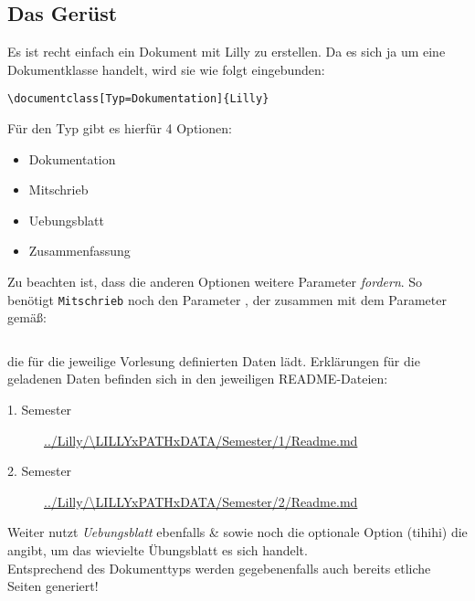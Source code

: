 \subsection{Das Gerüst}
Es ist recht einfach ein Dokument mit Lilly zu erstellen. Da es sich ja um eine Dokumentklasse handelt, wird sie wie folgt eingebunden:
\begin{lstlisting}[language=lLatex]
\documentclass[Typ=Dokumentation]{Lilly}
\end{lstlisting}
Für den Typ gibt es hierfür 4 Optionen:
\begin{multicols}{2}
    \begin{itemize}[label=$\diamond$]\narrowitems
        \item Dokumentation
        \item Mitschrieb
        \item Uebungsblatt
        \item Zusammenfassung
    \end{itemize}
\end{multicols}
Zu beachten ist, dass die anderen Optionen weitere Parameter \emph{fordern}. \newline
So benötigt \verb|Mitschrieb| noch den Parameter , der zusammen mit dem Parameter  gemäß:
\begin{lstlisting}[language=lLatex,frame=none]

\end{lstlisting}
die für die jeweilige Vorlesung definierten Daten lädt.
Erklärungen für die geladenen Daten befinden sich in den jeweiligen README-Dateien:
\begin{description}
    \item[1. Semester] \url{../Lilly/\LILLYxPATHxDATA/Semester/1/Readme.md}
    \item[2. Semester] \url{../Lilly/\LILLYxPATHxDATA/Semester/2/Readme.md}
\end{description}


Weiter nutzt \emph{Uebungsblatt} ebenfalls \& sowie noch die optionale Option (tihihi)  die angibt, um das wievielte Übungsblatt es sich handelt. \\

Entsprechend des Dokumenttyps werden gegebenenfalls auch bereits etliche Seiten generiert!

